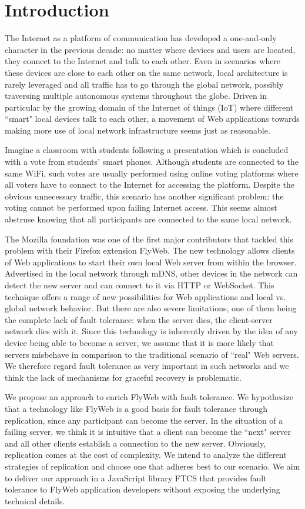 \section{Introduction}
\label{sec:introduction}

The Internet as a platform of communication has developed a one-and-only character in the previous decade: no matter where devices and users are located, they connect to the Internet and talk to each other. Even in scenarios where these devices are close to each other on the same network, local architecture is rarely leveraged and all traffic has to go through the global network, possibly traversing multiple autonomous systems throughout the globe. Driven in particular by the growing domain of the Internet of things (IoT) where different ``smart" local devices talk to each other, a movement of Web applications towards making more use of local network infrastructure seems just as reasonable.

Imagine a classroom with students following a presentation which is concluded with a vote from students' smart phones. Although students are connected to the same WiFi, such votes are usually performed using online voting platforms where all voters have to connect to the Internet for accessing the platform. Despite the obvious unnecessary traffic, this scenario has another significant problem: the voting cannot be performed upon failing Internet access. This seems almost abstruse knowing that all participants are connected to the same local network.

The Mozilla foundation was one of the first major contributors that tackled this problem with their Firefox extension FlyWeb. The new technology allows clients of Web applications to start their own local Web server from within the browser. Advertised in the local network through mDNS, other devices in the network can detect the new server and can connect to it via HTTP or WebSocket. This technique offers a range of new possibilities for Web applications and local vs. global network behavior. But there are also severe limitations, one of them being the complete lack of fault tolerance: when the server dies, the client-server network dies with it. Since this technology is inherently driven by the idea of any device being able to become a server, we assume that it is more likely that servers misbehave in comparison to the traditional scenario of ``real" Web servers. We therefore regard fault tolerance as very important in such networks and we think the lack of mechanisms for graceful recovery is problematic.

We propose an approach to enrich FlyWeb with fault tolerance. We hypothesize that a technology like FlyWeb is a good basis for fault tolerance through replication, since any participant can become the server. In the situation of a failing server, we think it is intuitive that a client can become the ``next" server and all other clients establish a connection to the new server. Obviously, replication comes at the cost of complexity. We intend to analyze the different strategies of replication and choose one that adheres best to our scenario. We aim to deliver our approach in a JavaScript library FTCS that provides fault tolerance to FlyWeb application developers without exposing the underlying technical details.